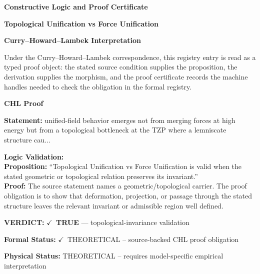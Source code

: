 \clearpage
\begingroup\tzpsupportsetup
\noindent\textbf{\fontsize{10.8pt}{12.8pt}\selectfont [ID 0169] Constructive Logic and Proof Certificate}\par
\noindent\textbf{\fontsize{10pt}{12pt}\selectfont Topological Unification vs Force Unification}\par
\vspace{0.45em}
\begingroup
\footnotesize
\setlength{\parskip}{0.22em}
\setlength{\parindent}{0pt}
\noindent\textbf{Curry--Howard--Lambek Interpretation}\par
Under the Curry--Howard--Lambek correspondence, this registry entry is read as a typed proof
object: the stated source condition supplies the proposition, the derivation supplies the
morphism, and the proof certificate records the machine handles needed to check the obligation
in the formal registry.

\vspace{0.45em}
\noindent\textbf{CHL Proof}\par
\textbf{Statement:} unified-field behavior emerges not from merging forces at high energy but from a
topological bottleneck at the TZP where a lemniscate structure cau...

\textbf{Logic Validation:}\\
\textbf{Proposition:} ``Topological Unification vs Force Unification is valid when the stated geometric or
topological relation preserves its invariant.''\\
\textbf{Proof:} The source statement names a geometric/topological carrier. The proof obligation is to
show that deformation, projection, or passage through the stated structure leaves the
relevant invariant or admissible region well defined.

\textbf{VERDICT:} \ensuremath{\checkmark}\ \textbf{TRUE} --- topological-invariance validation

\textbf{Formal Status:} \ensuremath{\checkmark}\ THEORETICAL -- source-backed CHL proof obligation

\textbf{Physical Status:} THEORETICAL -- requires model-specific empirical interpretation
\par\vspace{0.45em}
\par
\ifTZPDarkEdition
{}
\fi
\endgroup
\endgroup
